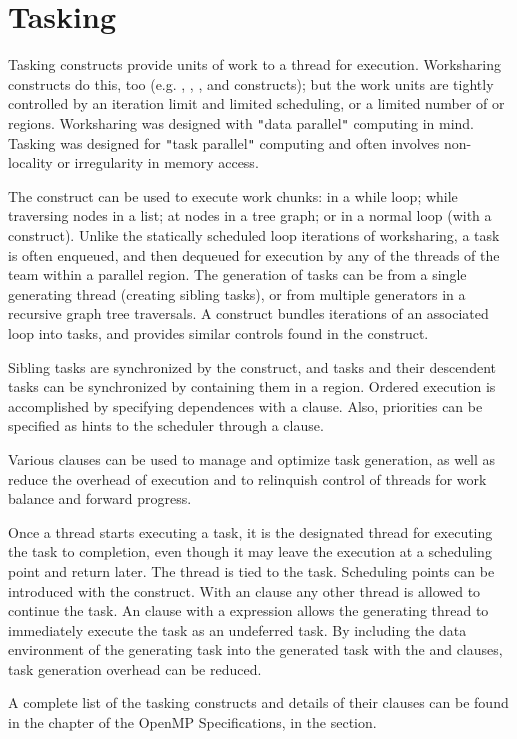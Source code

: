 \pagebreak
\chapter{Tasking}
\label{chap:tasking}

Tasking constructs provide units of work to a thread for execution.  
Worksharing constructs do this, too (e.g. , , 
, and  constructs); 
but the work units are tightly controlled by an iteration limit and limited 
scheduling, or a limited number of  or  regions. 
Worksharing was designed 
with \texttt{"}data parallel\texttt{"} computing in mind.  Tasking was designed for 
\texttt{"}task parallel\texttt{"} computing and often involves non-locality or irregularity 
in memory access.

The  construct can be used to execute work chunks: in a while loop; 
while traversing nodes in a list; at nodes in a tree graph; 
or in a normal loop (with a  construct).  
Unlike the statically scheduled loop iterations of worksharing, a task is 
often enqueued, and then dequeued for execution by any of the threads of the
team within a parallel region. The generation of tasks can be from a single 
generating thread (creating sibling tasks), or from multiple generators
in a recursive graph tree traversals. 
A  construct
bundles iterations of an associated loop into tasks, and provides 
similar controls found in the  construct.

Sibling tasks are synchronized by the  construct, and tasks
and their descendent tasks can be synchronized by containing them in
a  region.  Ordered execution is accomplished by specifying
dependences with a  clause. Also, priorities can be
specified as hints to the scheduler through a  clause.

Various clauses can be used to manage and optimize task generation,
as well as reduce the overhead of execution and to relinquish 
control of threads for work balance and forward progress. 

Once a thread starts executing a task, it is the designated thread 
for executing the task to completion, even though it may leave the
execution at a scheduling point and return later.  The thread is tied
to the task.  Scheduling points can be introduced with the 
construct.  With an  clause any other thread is allowed to continue
the task.  An  clause with a  expression allows the 
generating thread to immediately execute the task as an undeferred task.
By including the data environment of the generating task into the generated task with the 
 and  clauses, task generation overhead can be reduced.

A complete list of the tasking constructs and details of their clauses
can be found in the  chapter of the OpenMP Specifications,
in the  section.

